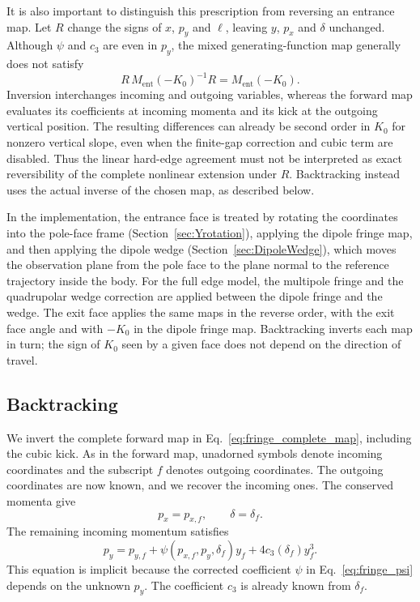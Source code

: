 It is also important to distinguish this prescription from reversing an
entrance map. Let $R$ change the signs of $x$, $p_y$ and $\ell$, leaving
$y$, $p_x$ and $\delta$ unchanged. Although $\psi$ and $c_3$ are even in
$p_y$, the mixed generating-function map generally does not satisfy
\begin{equation}
 R\,M_{\mathrm{ent}}(-K_0)^{-1}R=M_{\mathrm{ent}}(-K_0).
\end{equation}
Inversion interchanges incoming and outgoing variables, whereas the
forward map evaluates its coefficients at incoming momenta and its kick
at the outgoing vertical position. The resulting differences can already
be second order in $K_0$ for nonzero vertical slope, even when the
finite-gap correction and cubic term are disabled. Thus the linear
hard-edge agreement must not be interpreted as exact reversibility of the
complete nonlinear extension under $R$. Backtracking instead uses the
actual inverse of the chosen map, as described below.

In the implementation, the entrance face is treated by rotating the
coordinates into the pole-face frame (Section~\ref{sec:Yrotation}),
applying the dipole fringe map, and then applying the dipole wedge
(Section~\ref{sec:DipoleWedge}), which moves the observation plane from the
pole face to the plane normal to the reference trajectory inside the body.
For the full edge model, the multipole fringe and the quadrupolar wedge
correction are applied between the dipole fringe and the wedge. The exit
face applies the same maps in the reverse order, with the exit face angle
and with $-K_0$ in the dipole fringe map. Backtracking inverts each map in
turn; the sign of $K_0$ seen by a given face does not depend on the
direction of travel.

\subsection{Backtracking}
We invert the complete forward map in Eq.~\eqref{eq:fringe_complete_map},
including the cubic kick. As in the forward map, unadorned symbols denote
incoming coordinates and the subscript $f$ denotes outgoing coordinates.
The outgoing coordinates are now known, and we recover the incoming ones.
The conserved momenta give
\begin{equation}
 p_x=p_{x,f},\qquad \delta=\delta_f.
\end{equation}
The remaining incoming momentum satisfies
\begin{equation}
 p_y=p_{y,f}
 +\psi(p_{x,f},p_y,\delta_f)y_f+4c_3(\delta_f)y_f^3.
 \label{eq:fringe_inverse_py}
\end{equation}
This equation is implicit because the corrected coefficient $\psi$ in
Eq.~\eqref{eq:fringe_psi} depends on the unknown $p_y$.
The coefficient $c_3$ is already known from $\delta_f$.


